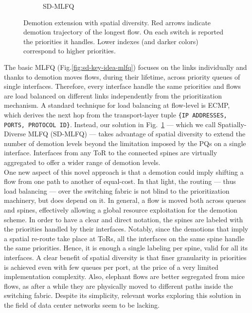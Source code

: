 \begin{figure}
\begin{subfigure}[htpb]{0.3\textwidth}
		\caption{SD-MLFQ}
		\label{fig:sd-key-idea-sdmlfq}
	\end{subfigure}
	\caption{Demotion extension with spatial diversity. Red arrows indicate demotion trajectory of the longest flow. On each switch is reported the priorities it handles. Lower indexes (and darker colors) correspond to higher priorities.}
	\label{fig:sd-key-idea}
\end{figure}
The basic MLFQ (Fig.\ref{fig:sd-key-idea-mlfq}) focuses on the links individually and thanks to demotion moves flows, during their lifetime, across priority queues of single interfaces. Therefore, every interface handle the same priorities and flows are load balanced on different links independently from the prioritization mechanism. A standard technique for load balancing at flow-level is ECMP, which derives the next hop from the transport-layer tuple \texttt{\{IP ADDRESSES, PORTS, PROTOCOL ID\}}. Instead, our solution in Fig.~\ref{fig:sd-key-idea-sdmlfq} --- which we call Spatially-Diverse MLFQ (SD-MLFQ) --- takes advantage of spatial diversity to extend the number of demotion levels beyond the limitation imposed by the PQs on a single interface. Interfaces from any ToR to the connected spines are virtually aggregated to offer a wider range of demotion levels. \\
One new aspect of this novel approach is that a demotion could imply shifting a flow from one path to another of equal-cost. In that light, the routing --- thus load balancing --- over the switching fabric is not blind to the prioritization machinery, but does depend on it. In general, a flow is moved both across queues and spines, effectively allowing a global resource exploitation for the demotion scheme. In order to have a clear and direct notation, the spines are labeled with the priorities handled by their interfaces. Notably, since the demotions that imply a spatial re-route take place at ToRs, all the interfaces on the same spine handle the same priorities. Hence, it is enough a single labeling per spine, valid for all its interfaces. 
A clear benefit of spatial diversity is that finer granularity in priorities is achieved even with few queues per port, at the price of a very limited implementation complexity. Also, elephant flows are better segregated from mice flows, as after a while they are physically moved to different paths inside the switching fabric. Despite its simplicity, relevant works exploring this solution in the field of data center networks seem to be lacking. 

